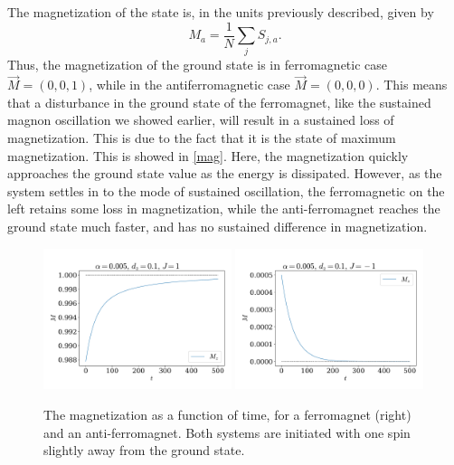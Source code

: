 \documentclass{article}
\begin{document}
    The magnetization of the state is, in the units previously described, given by
    \begin{equation*}
        M_a = \frac{1}{N} \sum_j S_{j, a}.
    \end{equation*}
    Thus, the magnetization of the ground state is in ferromagnetic case $\vec M = (0, 0, 1)$, while in the antiferromagnetic case $\vec M = (0, 0, 0)$.
    This means that a disturbance in the ground state of the ferromagnet, like the sustained magnon oscillation we showed earlier, will result in a sustained loss of magnetization.
    This is due to the fact that it is the state of maximum magnetization.
    This is showed in \autoref{mag}.
    Here, the magnetization quickly approaches the ground state value as the energy is dissipated.
    However, as the system settles in to the mode of sustained oscillation, the ferromagnetic on the left retains some loss in magnetization, while the anti-ferromagnet reaches the ground state much faster, and has no sustained difference in magnetization.


    \begin{figure}[H]
        \centering
        \includegraphics[width=0.49\textwidth]{../plots/mag.pdf}
        \includegraphics[width=0.49\textwidth]{../plots/mag2.pdf}
        \caption{The magnetization as a function of time, for a ferromagnet (right) and an anti-ferromagnet. Both systems are initiated with one spin slightly away from the ground state.}
        \label{mag}
    \end{figure}
\end{document}
